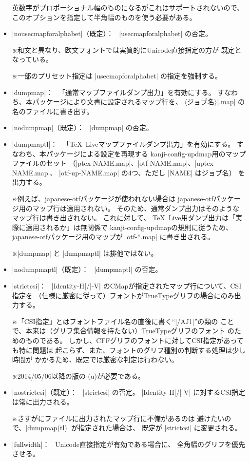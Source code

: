 \documentclass[uplatex,dvipdfmx,a4paper]{jsarticle}
\newcommand{\Pkg}[1]{\textsf{#1}}
\newcommand{\Meta}[1]{$\langle$\mbox{}#1\mbox{}$\rangle$}
\newcommand{\Note}{\par\noindent ※}
\newcommand{\Means}{：\ }
\providecommand{\Strong}[1]{\textsf{#1}}
\begin{document}
\begin{itemize}
  英数字がプロポーショナル幅のものになるがこれはサポートされないので、
  このオプションを指定して半角幅のものを使う必要がある。
\item |nousecmapforalphabet|（既定）\Means
  |usecmapforalphabet| の否定。
  \Note 和文と異なり、欧文フォントでは実質的にUnicode直接指定の方が
  既定となっている。
  \Note 一部のプリセット指定は |usecmapforalphabet| の指定を強制する。
\item |dumpmap|\Means
  「通常マップファイルダンプ出力」を有効にする。
  すなわち、本パッケージにより文書に設定されるマップ行を、
  \Meta{ジョブ名}|.map| の名のファイルに書き出す。
\item |nodumpmap|（既定）\Means
  |dumpmap| の否定。
\item |dumpmaptl|\Means
  「{\TeX}~Liveマップファイルダンプ出力」を有効にする。
  すなわち、本パッケージによる設定を再現する
  kanji-config-updmap用のマップファイルのセット
  （|ptex-NAME.map|、|otf-NAME.map|、|uptex-NAME.map|、
  |otf-up-NAME.map| の4つ、ただし |NAME| はジョブ名）
  を出力する。
  \Note 例えば、\Pkg{japanese-otf}パッケージが使われない場合は
  \Pkg{japanese-otf}パッケージ用のマップ行は適用されない。
  そのため、通常ダンプ出力はそのようなマップ行は書き出されない。
  これに対して、
  {\TeX}\ Live用ダンプ出力は「実際に適用されるか」は無関係で
  kanji-config-updmapの規則に従うため、
  \Pkg{japanese-otf}パッケージ用のマップが |otf-*.map| に書き出される。
  \Note |dumpmap| と |dumpmaptl| は排他では\Strong{ない}。
\item |nodumpmaptl|（既定）\Means
  |dumpmaptl| の否定。
\item |strictcsi|\Means
  |Identity-H|/|-V| のCMapが指定されたマップ行について、CSI指定を
  （仕様に厳密に従って）フォントがTrueTypeグリフの場合にのみ出力する。
  \Note 「CSI指定」とはフォントファイル名の直後に書く“|/AJ1|”の類の
    ことで、本来は（グリフ集合情報を持たない）TrueTypeグリフのフォント
    のためのものである。
    しかし、CFFグリフのフォントに対してCSI指定があっても特に問題は
    起こらず、また、フォントのグリフ種別の判断する処理は少し時間が
    かかるため、既定では厳密な判定は行わない。
  \Note 2014/05/06以降の版の{\logoe-(u)\pTeX}が必要である。
\item |nostrictcsi|（既定）\Means
  |strictcsi| の否定。
  |Identity-H|/|-V| に対するCSI指定は常に出力される。
  \Note さすがにファイルに出力されたマップ行に不備があるのは
    避けたいので、|dumpmap(tl)| が指定された場合は、
    既定が |strictcsi| に変更される。
\item |fullwidth|\Means
  Unicode直接指定が有効である場合に、
  全角幅のグリフを優先させる。

\end{itemize}
\end{document}
